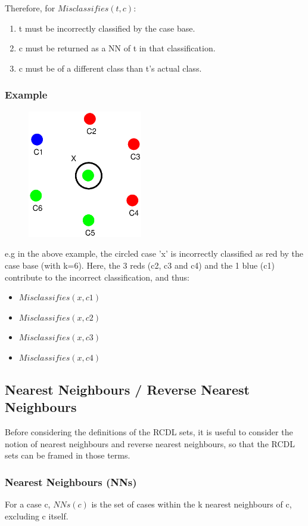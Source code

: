 \documentclass[a4paper,11pt]{report}
\begin{document}
Therefore, for $ Misclassifies(t, c) $:
\begin{enumerate}
	\item t must be incorrectly classified by the case base.
	\item c must be returned as a NN of t in that classification.
	\item c must be of a different class than t's actual class.
\end{enumerate}

\subsubsection{Example}
\begin{figure}[h!]
\includegraphics[width=5cm]{./Drawn/EqualDistanceMisclassifiesEg}
\end{figure}

e.g  in the above example, the circled case 'x' is incorrectly classified as red by the case base (with k=6). Here, the 3 reds (c2, c3 and c4) and the 1 blue (c1) contribute to the incorrect classification, and thus:
\begin{itemize}
	\item $ Misclassifies(x, c1) $
	\item $ Misclassifies(x, c2) $
	\item $ Misclassifies(x, c3) $
	\item $ Misclassifies(x, c4) $
\end{itemize}

\subsection{Nearest Neighbours / Reverse Nearest Neighbours}
Before considering the definitions of the RCDL sets, it is useful to consider the notion of nearest neighbours and reverse nearest neighbours, so that the RCDL sets can be framed in those terms.

\subsubsection{Nearest Neighbours (NNs)}
For a case c, $ NNs(c) $ is the set of cases within the k nearest neighbours of c, excluding c itself.
\end{document}
